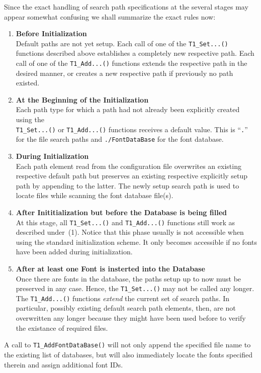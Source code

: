 Since the exact handling of search path specifications at the several stages
may appear somewhat confusing we shall summarize the exact rules now:
\begin{enumerate}
\item {\bfseries Before Initialization}\\
  Default paths are not yet setup. Each call of one of the \verb+T1_Set...()+
  functions described above establishes a completely new respective path. Each
  call of one of the \verb+T1_Add...()+ functions extends the respective path
  in the desired manner, or creates a new respective path if previously no
  path existed.
\item {\bfseries At the Beginning of the Initialization}\\
  Each path type for which a path had not already been explicitly created
  using the\\ \verb+T1_Set...()+ or \verb+T1_Add...()+ functions receives a
  default value. This is ``\verb+.+'' for the file search paths and
  \verb+./FontDataBase+ for the font database.
\item {\bfseries During Initialization}\\
  Each path element read from the configuration file overwrites an existing
  respective default path but preserves an existing respective explicitly
  setup path by appending to the latter. The newly setup search path is used
  to locate files while scanning the font database file(s).
\item {\bfseries After Inititialization but before the Database is being
    filled}\\ 
  At this stage, all \verb+T1_Set...()+ and \verb+T1_Add...()+ functions still
  work as described under~(1). Notice that this phase usually is not
  accessible when using the standard initialization scheme. It only becomes
  accessible if no fonts have been added during initialization.
\item {\bfseries After at least one Font is insterted into the Database}\\
  Once there are fonts in the database, the paths setup up
  to now must be preserved in any case. Hence, the \verb+T1_Set...()+ may not
  be called any longer. The \verb+T1_Add...()+ functions {\em extend} the
  current set of search paths. In particular, possibly existing default search
  path elements, then, are not overwritten any longer because they might have
  been used before to verify the existance of required files. 
\end{enumerate}
A call to \verb+T1_AddFontDataBase()+ will not only append the specified
file name to the existing list of databases, but will also immediately
locate the fonts specified therein and assign additional font IDs.


